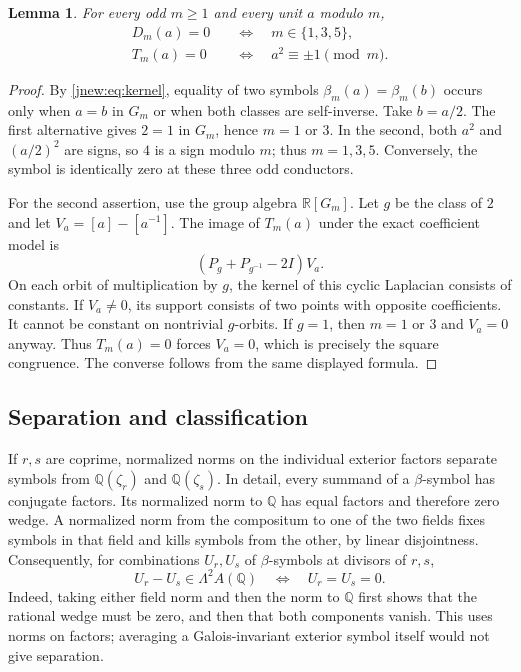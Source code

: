 \documentclass[11pt,a4paper]{article}
\newtheorem{lemma}[theorem]{Lemma}
\theoremstyle{definition}
\theoremstyle{remark}
\numberwithin{equation}{section}
\begin{document}
\begin{lemma}\label{jnew:lem:DT}
For every odd $m\ge1$ and every unit $a$ modulo $m$,
\begin{align}
 D_m(a)=0&\quad\Longleftrightarrow\quad m\in\{1,3,5\},
 \label{jnew:eq:D-zero}\\
 T_m(a)=0&\quad\Longleftrightarrow\quad a^2\equiv\pm1\pmod m.
 \label{jnew:eq:T-zero}
\end{align}
\end{lemma}
\begin{proof}
By \eqref{jnew:eq:kernel}, equality of two symbols
$\beta_m(a)=\beta_m(b)$ occurs only when $a=b$ in $G_m$ or when
both classes are self-inverse. Take $b=a/2$. The first alternative
gives $2=1$ in $G_m$, hence $m=1$ or $3$. In the second,
both $a^2$ and $(a/2)^2$ are signs, so $4$ is a sign modulo $m$;
thus $m=1,3,5$. Conversely, the symbol is identically zero at these
three odd conductors.

For the second assertion, use the group algebra $\mathbb R[G_m]$.
Let $g$ be the class of $2$ and let
$V_a=[a]-[a^{-1}]$. The image of $T_m(a)$ under the exact coefficient
model is
\[
 (P_g+P_{g^{-1}}-2I)V_a.
\]
On each orbit of multiplication by $g$, the kernel of this cyclic
Laplacian consists of constants. If $V_a\ne0$, its support consists
of two points with opposite coefficients. It cannot be constant
on nontrivial $g$-orbits. If $g=1$, then $m=1$ or $3$ and
$V_a=0$ anyway. Thus $T_m(a)=0$ forces $V_a=0$, which is precisely
the square congruence. The converse follows from the same displayed
formula.
\end{proof}

\subsection{Separation and classification}

If $r,s$ are coprime, normalized norms on the individual exterior
factors separate symbols from $\mathbb Q(\zeta_r)$ and
$\mathbb Q(\zeta_s)$. In detail, every summand of a $\beta$-symbol
has conjugate factors. Its normalized norm to $\mathbb Q$ has equal
factors and therefore zero wedge. A normalized norm from the compositum
to one of the two fields fixes symbols in that field and kills symbols
from the other, by linear disjointness. Consequently, for combinations
$U_r,U_s$ of $\beta$-symbols at divisors of $r,s$,
\begin{equation}\label{jnew:eq:separation}
 U_r-U_s\in\Lambda^2 A(\mathbb Q)
 \quad\Longleftrightarrow\quad U_r=U_s=0.
\end{equation}
Indeed, taking either field norm and then the norm to $\mathbb Q$
first shows that the rational wedge must be zero, and then that both
components vanish. This uses norms on factors; averaging a
Galois-invariant exterior symbol itself would not give separation.
\end{document}
